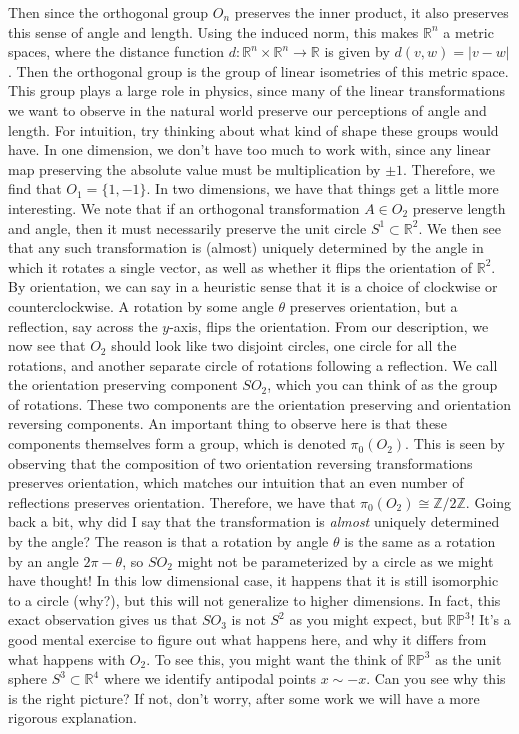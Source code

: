 \documentclass{article}
\newcommand{\R}{\mathbb{R}}
\newcommand{\Z}{\mathbb{Z}}
\begin{document}
Then since the orthogonal group $O_n$ preserves the inner product, it also preserves this sense of angle and length. Using the induced norm, this makes $\R^n$ a metric spaces, where the distance function $d : \R^n \times \R^n \to \R$ is given by $d(v,w) = |v - w|$. Then the orthogonal group is the group of linear isometries of this metric space. This group plays a large role in physics, since many of the linear transformations we want to observe in the natural world preserve our perceptions of angle and length. For intuition, try thinking about what kind of shape these groups would have. In one dimension, we don't have too much to work with, since any linear map preserving the absolute value must be multiplication by $\pm 1$. Therefore, we find that $O_1 = \{1, -1\}$. In two dimensions, we have that things get a little more interesting. We note that if an orthogonal transformation $A \in O_2$ preserve length and angle, then it must necessarily preserve the unit circle $S^1 \subset \R^2$. We then see that any such transformation is (almost) uniquely determined by the angle in which it rotates a single vector, as well as whether it flips the orientation of $\R^2$. By orientation, we can say in a heuristic sense that it is a choice of clockwise or counterclockwise. A rotation by some angle $\theta$ preserves orientation, but a reflection, say across the $y$-axis, flips the orientation. From our description, we now see that $O_2$ should look like two disjoint circles, one circle for all the rotations, and another separate circle of rotations following a reflection. We call the orientation preserving component $SO_2$, which you can think of as the group of rotations. These two components are the orientation preserving and orientation reversing components. An important thing to observe here is that these components themselves form a group, which is denoted $\pi_0(O_2)$. This is seen by observing that the composition of two orientation reversing transformations preserves orientation, which matches our intuition that an even number of reflections preserves orientation. Therefore, we have that $\pi_0(O_2) \cong \Z / 2\Z$. Going back a bit, why did I say that the transformation is \emph{almost} uniquely determined by the angle? The reason is that a rotation by angle $\theta$ is the same as a rotation by an angle $2\pi - \theta$, so $SO_2$ might not be parameterized by a circle as we might have thought! In this low dimensional case, it happens that it is still isomorphic to a circle (why?), but this will not generalize to higher dimensions. In fact, this exact observation gives us that $SO_3$ is not $S^2$ as you might expect, but $\mathbb{RP}^3$! It's a good mental exercise to figure out what happens here, and why it differs from what happens with $O_2$. To see this, you might want the think of $\mathbb{RP}^3$ as the unit sphere $S^3 \subset \R^4$ where we identify antipodal points $x \sim -x$. Can you see why this is the right picture? If not, don't worry, after some work we will have a more rigorous explanation.
\end{document}
